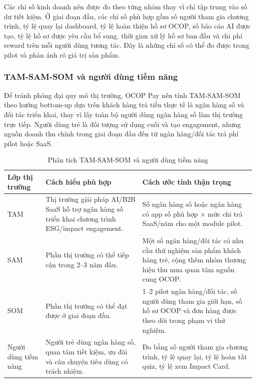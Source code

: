 \documentclass[13pt,a4paper]{extarticle}
\begin{document}
Các chỉ số kinh doanh nên được đo theo từng nhóm thay vì chỉ tập trung vào số dư tiết kiệm. Ở giai đoạn đầu, các chỉ số phù hợp gồm số người tham gia chương trình, tỷ lệ quay lại dashboard, tỷ lệ hoàn thiện hồ sơ OCOP, số báo cáo AI được tạo, tỷ lệ hồ sơ được yêu cầu bổ sung, thời gian xử lý hồ sơ ban đầu và chi phí reward trên mỗi người dùng tương tác. Đây là những chỉ số có thể đo được trong pilot và phản ánh rõ giá trị sản phẩm.

\subsubsection{TAM-SAM-SOM và người dùng tiềm năng}

Để tránh phóng đại quy mô thị trường, OCOP Pay nên tính TAM-SAM-SOM theo hướng bottom-up dựa trên khách hàng trả tiền thực tế là ngân hàng số và đối tác triển khai, thay vì lấy toàn bộ người dùng ngân hàng số làm thị trường trực tiếp. Người dùng trẻ là đối tượng sử dụng cuối và tạo engagement, nhưng nguồn doanh thu chính trong giai đoạn đầu đến từ ngân hàng/đối tác trả phí pilot hoặc SaaS.

\begin{table}[H]
\centering
\caption{Phân tích TAM-SAM-SOM và người dùng tiềm năng}
\begin{tabular}{|p{3cm}|p{6cm}|p{6cm}|}
\hline
\textbf{Lớp thị trường} & \textbf{Cách hiểu phù hợp} & \textbf{Cách ước tính thận trọng} \\
\hline
TAM & Thị trường giải pháp AI/B2B SaaS hỗ trợ ngân hàng số triển khai chương trình ESG/impact engagement. & Số ngân hàng số hoặc ngân hàng có app số phù hợp $\times$ mức chi trả SaaS/năm cho một module pilot. \\
\hline
SAM & Phần thị trường có thể tiếp cận trong 2--3 năm đầu. & Một số ngân hàng/đối tác có nhu cầu thử nghiệm sản phẩm khách hàng trẻ, cộng thêm nhóm thương hiệu thu mua quan tâm nguồn cung OCOP. \\
\hline
SOM & Phần thị trường có thể đạt được ở giai đoạn đầu. & 1--2 pilot ngân hàng/đối tác, số người dùng tham gia giới hạn, số hồ sơ OCOP và đơn hàng được theo dõi trong phạm vi thử nghiệm. \\
\hline
Người dùng tiềm năng & Người trẻ dùng ngân hàng số, quan tâm tiết kiệm, ưu đãi và câu chuyện tiêu dùng có trách nhiệm. & Đo bằng số người tham gia chương trình, tỷ lệ quay lại, tỷ lệ hoàn tất quiz, tỷ lệ xem Impact Card. \\
\hline
\end{tabular}
\end{table}
\end{document}
